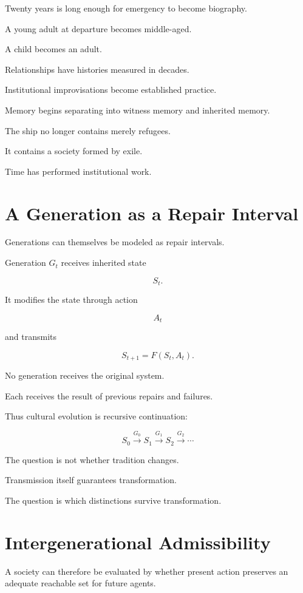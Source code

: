 \documentclass[11pt,oneside]{book}
\theoremstyle{definition}
\theoremstyle{remark}
\begin{document}
Twenty years is long enough for emergency to become biography.

A young adult at departure becomes middle-aged.

A child becomes an adult.

Relationships have histories measured in decades.

Institutional improvisations become established practice.

Memory begins separating into witness memory and inherited memory.

The ship no longer contains merely refugees.

It contains a society formed by exile.

Time has performed institutional work.

\section{A Generation as a Repair Interval}

Generations can themselves be modeled as repair intervals.

Generation \(G_t\) receives inherited state

\[
S_t.
\]

It modifies the state through action

\[
A_t
\]

and transmits

\[
S_{t+1}
=
F(S_t,A_t).
\]

No generation receives the original system.

Each receives the result of previous repairs and failures.

Thus cultural evolution is recursive continuation:

\[
S_0
\xrightarrow{G_0}
S_1
\xrightarrow{G_1}
S_2
\xrightarrow{G_2}
\cdots
\]

The question is not whether tradition changes.

Transmission itself guarantees transformation.

The question is which distinctions survive transformation.

\section{Intergenerational Admissibility}

A society can therefore be evaluated by whether present action preserves an adequate reachable set for future agents.
\end{document}
